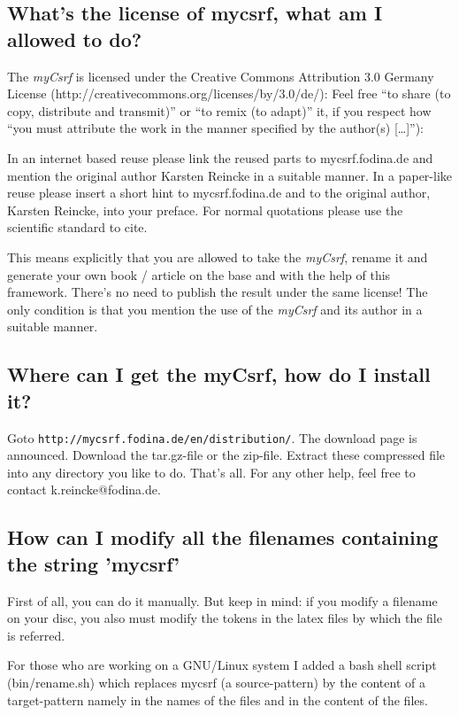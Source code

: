 \documentclass[
  DIV=calc,
  BCOR=5mm,
  11pt,
  headings=small,
  oneside,
  abstract=true,
  toc=bib,
  ngerman,english]{scrartcl}
\begin{document}
\subsection{What's the license of mycsrf, what am I allowed to do?}
The \textit{myCsrf} is licensed under the Creative Commons Attribution 3.0
Germany License (http://creativecommons.org/licenses/by/3.0/de/): Feel free
\enquote{to share (to copy, distribute and transmit)} or \enquote{to remix (to
adapt)} it, if you respect how \enquote{you must attribute the work in the
manner specified by the author(s) [\ldots]}):

In an internet based reuse please link the reused parts to mycsrf.fodina.de and
mention the original author Karsten Reincke in a suitable manner. In a
paper-like reuse please insert a short hint to mycsrf.fodina.de and to the
original author, Karsten Reincke, into your preface. For normal quotations
please use the scientific standard to cite.

This means explicitly that you are allowed to take the
\textit{myCsrf}, rename it and generate your own book / article on
the base and with the help of this framework. There's no need to publish the
result under the same license! The only condition is that you mention the use of
the \textit{myCsrf} and its author in a suitable manner.

\subsection{Where can I get the myCsrf, how do I install it?}

Goto \texttt{http://mycsrf.fodina.de/en/distribution/}. The download page
is announced. Download the tar.gz-file or the zip-file. Extract these compressed
file into any directory you like to do. That's all. For any other help, feel
free to contact k.reincke@fodina.de.

\subsection{How can I modify all the filenames containing the string 'mycsrf'}

First of all, you can do it manually. But keep in mind: if you
modify a filename on your disc, you also must modify the tokens 
in the latex files by which the file is referred.

For those who are working on a GNU/Linux system I added a
bash shell script (bin/rename.sh) which replaces mycsrf
(a source-pattern) by the content of a target-pattern namely
in the names of the files and in the content of the files.
\end{document}
